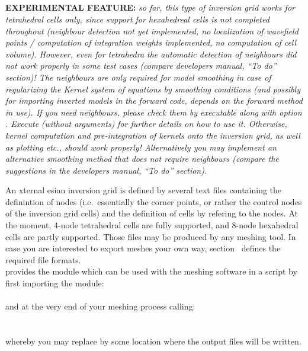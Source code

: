 \subsection{} \label{basic_steps,sec:invgrid,sub:ecart}
%
{\bf EXPERIMENTAL FEATURE:} \emph{so far, this type of inversion grid works for tetrahedral cells only,
since support for hexahedreal cells is not completed throughout (neighbour detection not yet implemented,
no localization of wavefield points / computation of integration weights implemented, no computation of cell volume). 
However, even for tetrahedra the automatic detection 
of neighbours did not work properly in some test cases (compare \ASKI{} developers manual, ``To do'' section)! 
The neighbours are only required for model smoothing in case of regularizing the Kernel system of equations by smoothing
conditions (and possibly for importing inverted models in the forward code, depends on the forward method in use).
If you need neighbours, please check them by executable}  \emph{along with option}  \emph{. Execute} 
 \emph{(without arguments)}  \emph{for further details on how to use it.
Otherwise, kernel computation and pre-integration of kernels onto the inversion grid, as well as plotting 
etc., should work properly! Alternatively you may implement an alternative smoothing method that does not require neighbours
(compare the suggestions in the \ASKI{} developers manual, ``To do'' section).}

An xternal esian inversion grid is defined by several text files containing the definintion 
of nodes (i.e.\  essentially the corner points, or rather the control nodes of the inversion grid cells) and the 
definition of cells by refering to the nodes. At the moment, 4-node tetrahedral cells are fully supported, and 8-node 
hexahedral cells are partly supported. 
Those files may be produced by any meshing tool. In case you are interested to export meshes your own way, 
section~ defines the required file formats.\\
\ASKI{} provides the  module  which can be used with the 
meshing software  in a  script by first importing the module:\\
\\
and at the very end of your meshing process calling:\\
\\
\\
whereby you may replace  by some location where the output files will be written.

